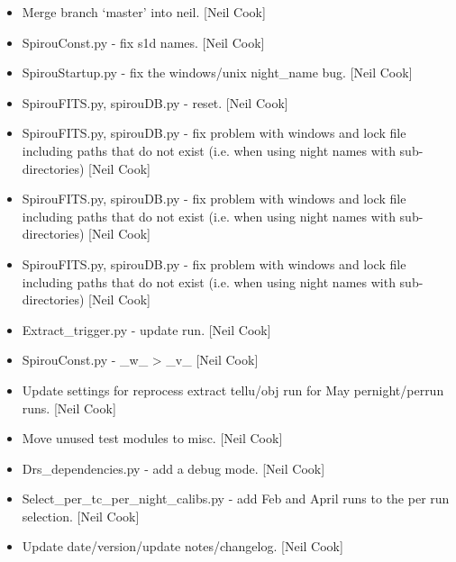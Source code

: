 \documentclass[a4paper,10pt,english]{report}
\begin{document}
\label{\detokenize{misc/changelog:id134}}\begin{itemize}
\item {} 
Merge branch ‘master’ into neil. {[}Neil Cook{]}

\item {} 
SpirouConst.py - fix s1d names. {[}Neil Cook{]}

\item {} 
SpirouStartup.py - fix the windows/unix night\_name bug. {[}Neil Cook{]}

\item {} 
SpirouFITS.py, spirouDB.py - reset. {[}Neil Cook{]}

\item {} 
SpirouFITS.py, spirouDB.py - fix problem with windows and lock file
including paths that do not exist (i.e. when using night names with
sub-directories) {[}Neil Cook{]}

\item {} 
SpirouFITS.py, spirouDB.py - fix problem with windows and lock file
including paths that do not exist (i.e. when using night names with
sub-directories) {[}Neil Cook{]}

\item {} 
SpirouFITS.py, spirouDB.py - fix problem with windows and lock file
including paths that do not exist (i.e. when using night names with
sub-directories) {[}Neil Cook{]}

\item {} 
Extract\_trigger.py - update run. {[}Neil Cook{]}

\item {} 
SpirouConst.py - \_w\_ \textendash{}\textgreater{} \_v\_ {[}Neil Cook{]}

\item {} 
Update settings for reprocess extract tellu/obj run for May
pernight/perrun runs. {[}Neil Cook{]}

\item {} 
Move unused test modules to misc. {[}Neil Cook{]}

\item {} 
Drs\_dependencies.py - add a debug mode. {[}Neil Cook{]}

\item {} 
Select\_per\_tc\_per\_night\_calibs.py - add Feb and April runs to the per
run selection. {[}Neil Cook{]}

\item {} 
Update date/version/update notes/changelog. {[}Neil Cook{]}

\end{itemize}
\end{document}

